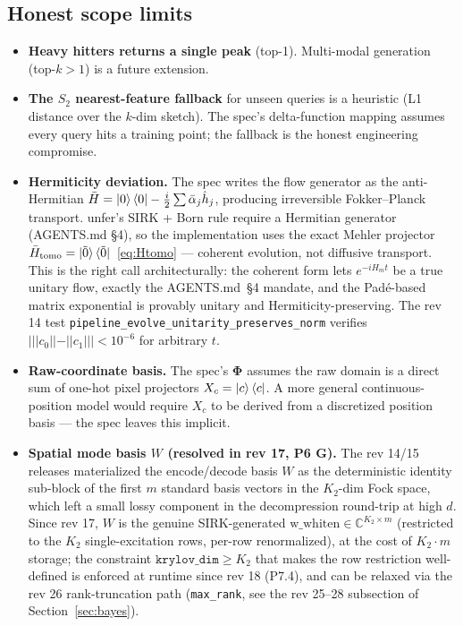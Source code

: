 \documentclass[11pt, a4paper]{article}
\newcommand{\Cset}{\mathbb{C}}
\begin{document}
\subsection{Honest scope limits}

\begin{itemize}
\item \textbf{Heavy hitters returns a single peak} (top-1). Multi-modal
generation (top-$k>1$) is a future extension.
\item \textbf{The $S_2$ nearest-feature fallback} for unseen queries is a
heuristic (L1 distance over the $k$-dim sketch). The spec's delta-function
mapping assumes every query hits a training point; the fallback is the
honest engineering compromise.
\item \textbf{Hermiticity deviation.} The spec writes the flow generator as
the anti-Hermitian $\bar H=\ket{0}\bra{0}-\frac{i}{2}\sum\bar\alpha_j\hat h_j$,
producing irreversible Fokker--Planck transport. unfer's SIRK + Born rule
require a Hermitian generator (AGENTS.md \S4), so the implementation uses
the exact Mehler projector
$\bar H_{\mathrm{tomo}}=\ket{\tilde 0}\bra{\tilde 0}$~\eqref{eq:Htomo}
--- coherent evolution, not diffusive transport.
This is the right call architecturally: the coherent form lets
$e^{-iH_m t}$ be a true unitary flow, exactly the AGENTS.md~\S4 mandate,
and the Pad\'e-based matrix exponential is provably unitary and
Hermiticity-preserving. The rev 14 test
\texttt{pipeline\_evolve\_unitarity\_preserves\_norm} verifies
$|||c_0||-||c_1||| < 10^{-6}$ for arbitrary $t$.
\item \textbf{Raw-coordinate basis.} The spec's $\mathbf\Phi$ assumes the
raw domain is a direct sum of one-hot pixel projectors $X_c=\ket{c}\bra{c}$.
A more general continuous-position model would require $X_c$ to be derived
from a discretized position basis --- the spec leaves this implicit.
\item \textbf{Spatial mode basis $W$ (resolved in rev 17, P6 G).} The
rev 14/15 releases materialized the encode/decode basis $W$ as the
deterministic identity sub-block of the first $m$ standard basis vectors
in the $K_2$-dim Fock space, which left a small lossy component in the
decompression round-trip at high $d$. Since rev 17, $W$ is the genuine
SIRK-generated $\mathrm{w\_whiten}\in\Cset^{K_2\times m}$ (restricted to
the $K_2$ single-excitation rows, per-row renormalized), at the cost of
$K_2\cdot m$ storage; the constraint $\texttt{krylov\_dim}\ge K_2$ that
makes the row restriction well-defined is enforced at runtime since
rev 18 (P7.4), and can be relaxed via the rev 26 rank-truncation path
(\texttt{max\_rank}, see the rev 25--28 subsection of
Section~\ref{sec:bayes}).
\end{itemize}
\end{document}
